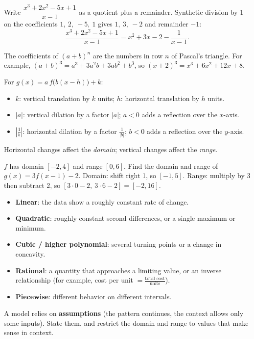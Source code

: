 \documentclass[11pt]{article}
\begin{document}
\begin{example}
Write $\dfrac{x^3+2x^2-5x+1}{x-1}$ as a quotient plus a remainder.
\sol Synthetic division by $1$ on the coefficients $1,\ 2,\ -5,\ 1$ gives $1,\ 3,\ -2$ and remainder $-1$:
\[ \frac{x^3+2x^2-5x+1}{x-1}=x^2+3x-2-\frac{1}{x-1}. \]
\end{example}

\begin{keyidea}
The coefficients of $(a+b)^n$ are the numbers in row $n$ of Pascal's triangle. For example, $(a+b)^3=a^3+3a^2b+3ab^2+b^3$, so $(x+2)^3=x^3+6x^2+12x+8$.
\end{keyidea}

\begin{keyidea}
For $g(x)=a\,f\big(b(x-h)\big)+k$:
\begin{itemize}
\item $k$: vertical translation by $k$ units; $h$: horizontal translation by $h$ units.
\item $|a|$: vertical dilation by a factor $|a|$; $a<0$ adds a reflection over the $x$-axis.
\item $\left|\frac1b\right|$: horizontal dilation by a factor $\frac1{|b|}$; $b<0$ adds a reflection over the $y$-axis.
\end{itemize}
Horizontal changes affect the \emph{domain}; vertical changes affect the \emph{range}.
\end{keyidea}

\begin{example}
$f$ has domain $[-2,4]$ and range $[0,6]$. Find the domain and range of $g(x)=3f(x-1)-2$.
\sol Domain: shift right 1, so $[-1,5]$. Range: multiply by 3 then subtract 2, so $[3\cdot 0-2,\ 3\cdot 6-2]=[-2,16]$.
\end{example}

\begin{keyidea}
\begin{itemize}
\item \textbf{Linear}: the data show a roughly constant rate of change.
\item \textbf{Quadratic}: roughly constant second differences, or a single maximum or minimum.
\item \textbf{Cubic / higher polynomial}: several turning points or a change in concavity.
\item \textbf{Rational}: a quantity that approaches a limiting value, or an inverse relationship (for example, cost per unit $=\frac{\text{total cost}}{\text{units}}$).
\item \textbf{Piecewise}: different behavior on different intervals.
\end{itemize}
\end{keyidea}
A model relies on \textbf{assumptions} (the pattern continues, the context allows only some inputs). State them, and restrict the domain and range to values that make sense in context.
\end{document}
